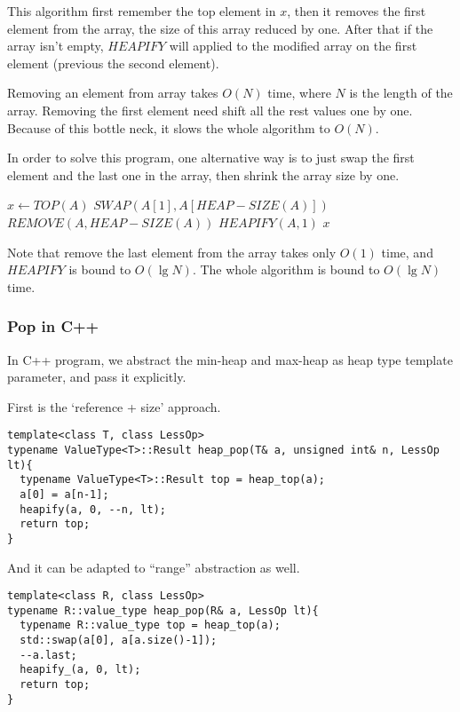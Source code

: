 \documentclass{article}
\begin{document}
This algorithm first remember the top element in $x$, then
it removes the first element from the array, the size of
this array reduced by one. After that if the array isn't 
empty, $HEAPIFY$ will applied to the modified array on
the first element (previous the second element).

Removing an element from array takes $O(N)$ time,
where $N$ is the length of the array. Removing the first
element need shift all the rest values one by one.
Because of this bottle neck, it slows the whole algorithm
to $O(N)$.

In order to solve this program, one alternative way is 
to just swap the first element and the last one in the
array, then shrink the array size by one.

\begin{algorithmic}[1]
  \State $x \gets TOP(A)$
  \State $SWAP(A[1], A[HEAP-SIZE(A)])$
  \State $REMOVE(A, HEAP-SIZE(A))$
    \State $HEAPIFY(A, 1)$
  \EndIf
  \State \Return $x$
\EndFunction
\end{algorithmic}

Note that remove the last element from the array takes 
only $O(1)$ time, and $HEAPIFY$ is bound to $O(\lg{N})$.
The whole algorithm is bound to $O(\lg{N})$ time.

\subsubsection*{Pop in C++}

In C++ program, we abstract the min-heap and max-heap as heap type
template parameter, and pass it explicitly.

First is the `reference + size' approach.

\lstset{language=C++}
\begin{lstlisting}
template<class T, class LessOp>
typename ValueType<T>::Result heap_pop(T& a, unsigned int& n, LessOp lt){
  typename ValueType<T>::Result top = heap_top(a);
  a[0] = a[n-1];
  heapify(a, 0, --n, lt);
  return top;
}
\end{lstlisting}

And it can be adapted to ``range'' abstraction as well.

\begin{lstlisting}
template<class R, class LessOp>
typename R::value_type heap_pop(R& a, LessOp lt){
  typename R::value_type top = heap_top(a);
  std::swap(a[0], a[a.size()-1]);
  --a.last;
  heapify_(a, 0, lt);
  return top;
}
\end{lstlisting}
\end{document}
